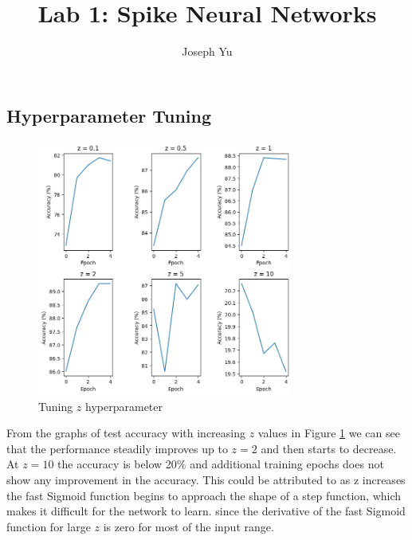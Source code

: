 \documentclass[12pt, letterpaper]{article}
\author{Joseph Yu}
\title{Lab 1: Spike Neural Networks}
\begin{document}
\maketitle
\setcounter{section}{4}
\subsection{Hyperparameter Tuning}
\begin{figure}[H]
    \centering
    \includegraphics[width=0.75\textwidth]{z_parameter_tuning.png}
    \caption{Tuning $z$ hyperparameter}
    \label{fig:z_tuning}
\end{figure}
From the graphs of test accuracy with increasing $z$ values in Figure \ref{fig:z_tuning} we can see that the performance steadily improves up to $z = 2$ and then starts to decrease. At $z = 10$ the accuracy is below 20\% and additional training epochs does not show any improvement in the accuracy. This could be attributed to as z increases the fast Sigmoid function begins to approach the shape of a step function, which makes it difficult for the network to learn. since the derivative of the fast Sigmoid function for large $z$ is zero for most of the input range.
\end{document}

